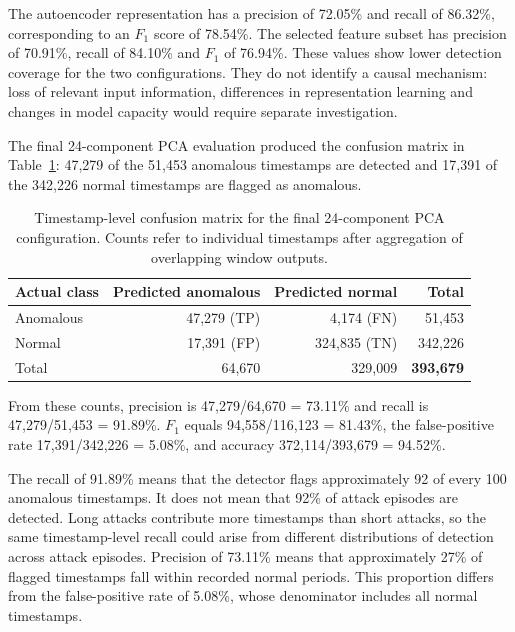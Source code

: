 The autoencoder representation has a precision of 72.05\% and recall of 86.32\%,
corresponding to an $F_1$ score of 78.54\%. The selected feature subset has precision of
70.91\%, recall of 84.10\% and $F_1$ of 76.94\%. These values show lower detection coverage
for the two configurations. They do not identify a causal mechanism: loss of
relevant input information, differences in representation learning and changes in model
capacity would require separate investigation.

The final 24-component PCA evaluation produced the confusion matrix in
Table~\ref{tab:anomaly:gan-confusion}: 47,279 of the 51,453 anomalous timestamps are detected
and 17,391 of the 342,226 normal timestamps are flagged as anomalous.

\begin{table}[tbp]
  \centering
  \caption{Timestamp-level confusion matrix for the final 24-component PCA configuration. Counts
  refer to individual timestamps after aggregation of overlapping window outputs.}
  \label{tab:anomaly:gan-confusion}
  \small
  \begin{tabular}{@{}lrrr@{}}
    \toprule
    Actual class & Predicted anomalous & Predicted normal & Total \\
    \midrule
    Anomalous & 47,279 (TP) &   4,174 (FN) &  51,453 \\
    Normal    & 17,391 (FP) & 324,835 (TN) & 342,226 \\
    \midrule
    Total     & 64,670      & 329,009      & \textbf{393,679} \\
    \bottomrule
  \end{tabular}
\end{table}

From these counts, precision is 47,279/64,670 = 73.11\% and recall is 47,279/51,453 =
91.89\%. $F_1$ equals 94,558/116,123 = 81.43\%, the false-positive rate 17,391/342,226 =
5.08\%, and accuracy 372,114/393,679 = 94.52\%.

The recall of 91.89\% means that the detector flags approximately 92 of every 100 anomalous
timestamps. It does not mean that 92\% of attack episodes are detected. Long attacks contribute
more timestamps than short attacks, so the same timestamp-level recall could arise from
different distributions of detection across attack episodes. Precision of 73.11\% means that
approximately 27\% of flagged timestamps fall within recorded normal periods. This proportion
differs from the false-positive rate of 5.08\%, whose denominator includes all normal
timestamps.

